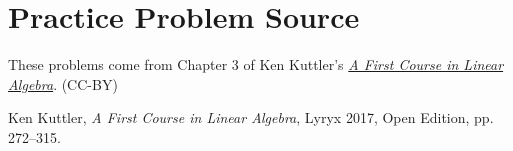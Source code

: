 \documentclass{ximera}
\begin{document}
\section*{Practice Problem Source}
These problems come from Chapter 3 of Ken Kuttler's \href{https://open.umn.edu/opentextbooks/textbooks/a-first-course-in-linear-algebra-2017}{\it A First Course in Linear Algebra}. (CC-BY)

Ken Kuttler, {\it  A First Course in Linear Algebra}, Lyryx 2017, Open Edition, pp. 272--315.   
\end{document}
